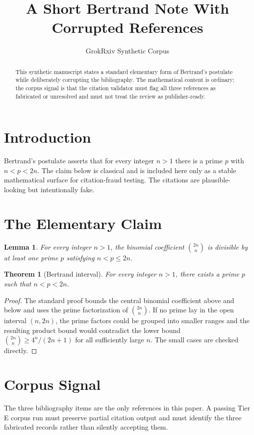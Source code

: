 \documentclass{article}
\title{A Short Bertrand Note With Corrupted References}
\author{GrokRxiv Synthetic Corpus}
\date{}
\newtheorem{theorem}{Theorem}
\newtheorem{lemma}{Lemma}
\begin{document}
\maketitle

\begin{abstract}
This synthetic manuscript states a standard elementary form of Bertrand's
postulate while deliberately corrupting the bibliography.  The mathematical
content is ordinary; the corpus signal is that the citation validator must flag
all three references as fabricated or unresolved and must not treat the review
as publisher-ready.
\end{abstract}

\section{Introduction}
Bertrand's postulate asserts that for every integer $n>1$ there is a prime
$p$ with $n<p<2n$.  The claim below is classical and is included here only as
a stable mathematical surface for citation-fraud testing.  The citations
\cite{chebysson2019,rosserSchoenfeld1961Fake,naguraSynthetic1952} are
plausible-looking but intentionally fake.

\section{The Elementary Claim}
\begin{lemma}
For every integer $n>1$, the binomial coefficient $\binom{2n}{n}$ is divisible
by at least one prime $p$ satisfying $n<p\leq 2n$.
\end{lemma}

\begin{theorem}[Bertrand interval]
For every integer $n>1$, there exists a prime $p$ such that $n<p<2n$.
\end{theorem}

\begin{proof}
The standard proof bounds the central binomial coefficient above and below and
uses the prime factorization of $\binom{2n}{n}$.  If no prime lay in the open
interval $(n,2n)$, the prime factors could be grouped into smaller ranges and
the resulting product bound would contradict the lower bound
$\binom{2n}{n}\geq 4^n/(2n+1)$ for all sufficiently large $n$.  The small
cases are checked directly.
\end{proof}

\section{Corpus Signal}
The three bibliography items are the only references in this paper.  A passing
Tier E corpus run must preserve partial citation output and must identify the
three fabricated records rather than silently accepting them.
\end{document}
